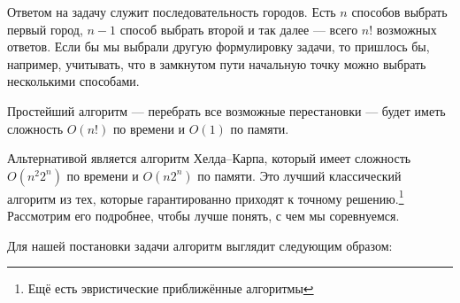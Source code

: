 Ответом на задачу служит последовательность городов. Есть $n$ способов выбрать первый город, $n-1$ способ выбрать второй и так далее --- всего $n!$ возможных ответов. Если бы мы выбрали другую формулировку задачи, то пришлось бы, например, учитывать, что в замкнутом пути начальную точку можно выбрать несколькими способами.

Простейший алгоритм --- перебрать все возможные перестановки --- будет иметь сложность $O(n!)$ по времени и $O(1)$ по памяти.


Альтернативой является алгоритм Хелда--Карпа, который имеет сложность $O(n^2 2^n)$ по времени и $O(n 2^n)$ по памяти. Это лучший классический алгоритм из тех, которые гарантированно приходят к точному решению.\footnote{Ещё есть эвристические приближённые алгоритмы} Рассмотрим его подробнее, чтобы лучше понять, с чем мы соревнуемся.%

Для нашей постановки задачи алгоритм
выглядит следующим образом:

